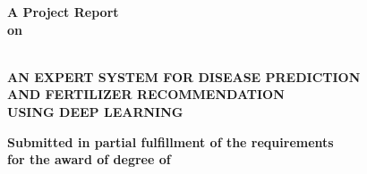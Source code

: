 \documentclass[12pt, English]{article}
\begin{document}
\begin{titlepage}

\begin{center}
\vspace*{-1in}



\begin{Large}
\vspace*{0.1in}
\textbf{A Project Report}
\\
\vspace*{-0.1in}
\textbf{on}
\end{Large}
\textbf{\Large \\ AN EXPERT SYSTEM FOR DISEASE PREDICTION }
\vspace*{-0.15in}
\textbf{\Large \\ AND FERTILIZER RECOMMENDATION}
\vspace*{0.0in}
\textbf{\Large \\ USING DEEP LEARNING}

\begin{large}
\textbf{{Submitted in partial fulfillment of the requirements \\
for the award of degree of}}\\
\end{large}
\begin{large}
{\textbf{BACHELOR OF TECHNOLOGY }
\vspace*{-0.05in}
\\{\textbf{in}} 
\vspace*{-0.05in}
\\{\textbf{Information Technology}}
\vspace*{-0.05in}
\\ {\textbf{by}}\\
\end{large}


\end{center}
\end{titlepage}
\end{document}
